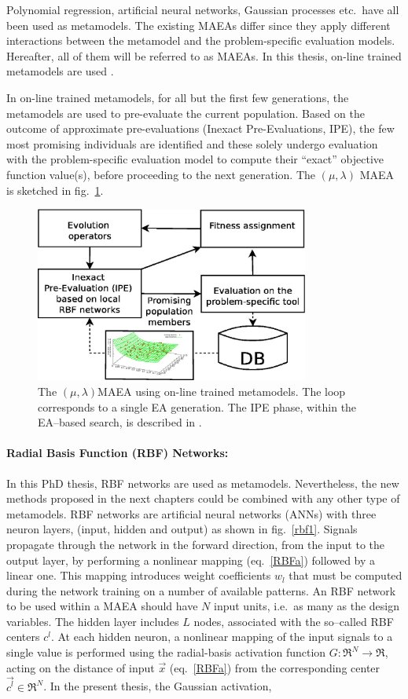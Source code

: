 Polynomial regression, artificial neural networks, Gaussian processes etc.\ have all been used as metamodels. The existing MAEAs differ since they apply different interactions between the metamodel and the problem-specific evaluation models. Hereafter, all of them will be referred to as MAEAs. In this thesis, on-line trained metamodels are used \cite{LTT_2_018,LTT_2_020,LTT_2_029}. 
 
In on-line trained metamodels, for all but the first few generations, the metamodels are used to pre-evaluate the current population. Based on the outcome of approximate pre-evaluations (Inexact Pre-Evaluations, IPE), the few most promising individuals are identified and these solely undergo evaluation with the problem-specific evaluation model to compute their ``exact''  objective function value(s), before proceeding to the next generation. The $(\mu,\lambda)$ MAEA is sketched in fig.\ \ref{MAEA}.


\begin{figure}[h!]
\centering
\includegraphics[width=90mm]{MAEA.eps} 
\caption{The $(\mu,\lambda)$MAEA using on-line trained metamodels. The loop corresponds to a single EA generation. The IPE phase, within the EA--based search, is described in \cite{LTT_2_018,LTT_2_020,LTT_2_029}. }
\label{MAEA}
\end{figure}


\paragraph{Radial Basis Function (RBF) Networks:}
In this PhD thesis, RBF networks are used as metamodels. Nevertheless, the new methods proposed in the next chapters could be combined with any other type of metamodels. RBF networks are artificial neural networks (ANNs) \cite{Hayk1999} with three neuron layers, (input, hidden and output) as shown in fig.\ \ref{rbf1}. Signals propagate through the network in the forward direction, from the input to the output layer, by performing a nonlinear mapping (eq.\ \ref{RBFa}) followed by a linear one. This mapping introduces weight coefficients $w_l$ that must be computed during the network training on a number of available patterns. An RBF network to be used within a MAEA should have $N$ input units, i.e.\ as many as the  design variables. The hidden layer includes $L$ nodes, associated with the so–called RBF centers $c^l$. At each hidden neuron, a nonlinear mapping of the input signals to a single value is performed using the radial-basis activation function $G:\Re^N \rightarrow \Re$, acting on the distance of input $\vec{x}$ (eq.\ \ref{RBFa}) from the corresponding center $\vec{c^l} \in \Re^N$.  In the present thesis, the Gaussian activation, 


